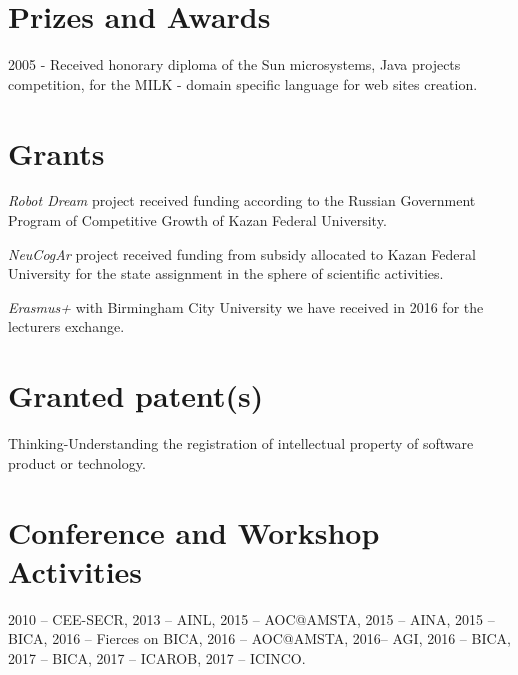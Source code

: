 \documentclass{moderncv}
\begin{document}

\section{Prizes and Awards}

2005 - Received honorary diploma of the Sun microsystems, Java projects competition, for the MILK - domain specific language for web sites creation.

\section{Grants}

\emph{Robot Dream} project received funding according to the Russian Government Program of Competitive Growth of Kazan Federal University.

\emph{NeuCogAr} project received funding from subsidy allocated to Kazan Federal University for the state assignment in the sphere of scientific activities.

\emph{Erasmus+} with Birmingham City University we have received in 2016 for the lecturers exchange. 

\section{Granted patent(s)}

Thinking-Understanding the registration of intellectual property of software product or technology.

 
\nocite{*}
\printbibliography[title={Papers}]

\cvitem{}{}

\section{Conference and Workshop Activities}

2010 -- CEE-SECR, 2013 -- AINL, 2015 -- AOC@AMSTA, 2015 -- AINA, 2015 -- BICA, 2016 -- Fierces on BICA, 2016 -- AOC@AMSTA, 2016-- AGI, 2016 -- BICA, 2017 -- BICA, 2017 -- ICAROB, 2017 -- ICINCO.
\end{document}
